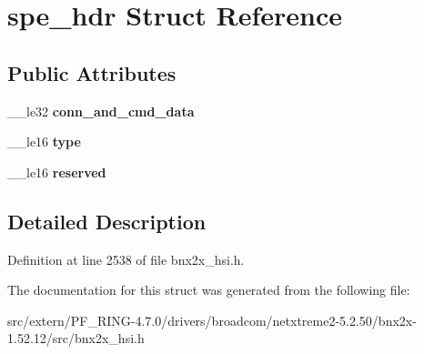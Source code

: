 \hypertarget{structspe__hdr}{
\section{spe\_\-hdr Struct Reference}
\label{structspe__hdr}
}
\subsection*{Public Attributes}
\begin{DoxyCompactItemize}
\item 
\hypertarget{structspe__hdr_a39b1bfedc03efe9bf79a9d95fe81e4c4}{
\_\-\_\-le32 {\bfseries conn\_\-and\_\-cmd\_\-data}}
\label{structspe__hdr_a39b1bfedc03efe9bf79a9d95fe81e4c4}

\item 
\hypertarget{structspe__hdr_a109b129c7f79b3de7077a277b7c39d6b}{
\_\-\_\-le16 {\bfseries type}}
\label{structspe__hdr_a109b129c7f79b3de7077a277b7c39d6b}

\item 
\hypertarget{structspe__hdr_a33fd2690963a42c8b8a7a4d1a07706bc}{
\_\-\_\-le16 {\bfseries reserved}}
\label{structspe__hdr_a33fd2690963a42c8b8a7a4d1a07706bc}

\end{DoxyCompactItemize}


\subsection{Detailed Description}


Definition at line 2538 of file bnx2x\_\-hsi.h.



The documentation for this struct was generated from the following file:\begin{DoxyCompactItemize}
\item 
src/extern/PF\_\-RING-\/4.7.0/drivers/broadcom/netxtreme2-\/5.2.50/bnx2x-\/1.52.12/src/bnx2x\_\-hsi.h\end{DoxyCompactItemize}
